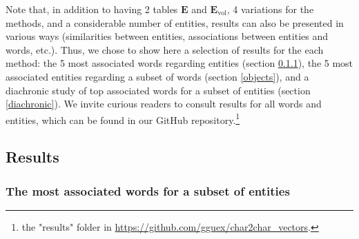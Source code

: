 \documentclass[
twocolumn,
]{ceurart}
\begin{document}
Note that, in addition to having 2 tables $\mathbf{E}$ and $\mathbf{E}_\text{vol}$, 4 variations for the methods, and a considerable number of entities, results can also be presented in various ways (similarities between entities, associations between entities and words, etc.). Thus, we chose to show here a selection of results for the each method: the 5 most associated words regarding entities (section \ref{words}), the 5 most associated entities regarding a subset of words (section \ref{objects}), and a diachronic study of top associated words for a subset of entities (section \ref{diachronic}). We invite curious readers to consult results for all words and entities, which can be found in our GitHub repository.\footnote{the "results" folder in \url{https://github.com/gguex/char2char_vectors}.}

\subsection{Results}

\subsubsection{The most associated words for a subset of entities}
\label{words}

\end{document}
